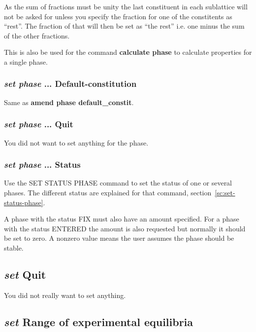 \documentclass[11pt]{article}
\begin{document}
As the sum of fractions must be unity the last constituent in each
sublattice will not be asked for unless you specify the fraction for
one of the constitents as ``rest''.  The fraction of that will then be
set as ``the rest'' i.e. one minus the sum of the other fractions.

This is also be used for the command {\bf
  calculate phase} to calculate properties for a single phase.

\hypertarget{Set phase ... default-constitu}{}
\subsubsection{{\em set phase} ... Default-constitution}

Same as {\bf amend phase default\_constit}.

\hypertarget{Set phase ... quit}{}
\subsubsection{{\em set phase} ... Quit}

You did not want to set anything for the phase.

\hypertarget{Set phase status}{}
\subsubsection{{\em set phase} ... Status}\label{sc:setphstat}

Use the SET STATUS PHASE command to set the status of one or several
phases.  The different status are explained for that command,
section~\ref{sc:set-status-phase}.

A phase with the status FIX must also have an amount specified.  For a
phase with the status ENTERED the amount is also requested but
normally it should be set to zero.  A nonzero value means the user
assumes the phase should be stable.

\hypertarget{Set quit}{}
\subsection{{\em set} Quit}

You did not really want to set anything.

\hypertarget{Set range}{}
\subsection{{\em set} Range of experimental equilibria}\label{sc:setrange}
\end{document}
